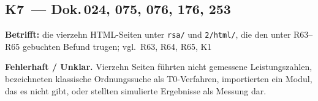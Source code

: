\medskip

\subsection*{K7~--- Dok.\,024, 075, 076, 176, 253}

\noindent\textbf{Betrifft:} die vierzehn HTML-Seiten unter \texttt{rsa/}
und \texttt{2/html/}, die den unter R63--R65 gebuchten Befund trugen;
vgl.\ R63, R64, R65, K1

\smallskip\noindent\textbf{Fehlerhaft / Unklar.}\quad
Vierzehn Seiten führten nicht gemessene Leistungszahlen, bezeichneten
klassische Ordnungssuche als T0-Verfahren, importierten ein Modul, das
es nicht gibt, oder stellten simulierte Ergebnisse als Messung dar.

